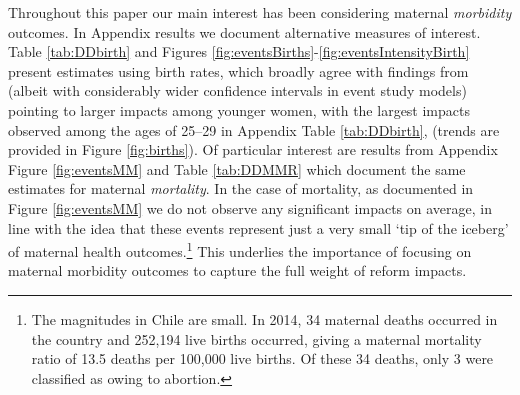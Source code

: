 \documentclass[12pt]{article}
\begin{document}
\begin{spacing}{1.9}
  Throughout this paper our main interest has been considering maternal \emph{morbidity} outcomes.  In Appendix results we document alternative measures of interest.  Table \ref{tab:DDbirth} and Figures \ref{fig:eventsBirths}-\ref{fig:eventsIntensityBirth} present estimates using birth rates, which broadly agree with findings from \citet{BentancorClarke2017} (albeit with considerably wider confidence intervals in event study models) pointing to larger impacts among younger women, with the largest impacts observed among the ages of 25--29 in Appendix Table \ref{tab:DDbirth}, (trends are provided in Figure \ref{fig:births}).  Of particular interest are results from Appendix Figure \ref{fig:eventsMM} and Table \ref{tab:DDMMR} which document the same estimates for maternal \emph{mortality}. In the case of mortality, as documented in Figure \ref{fig:eventsMM} we do not observe any significant impacts on average, in line with the idea that these events represent just a very small `tip of the iceberg' of maternal health outcomes.\footnote{The magnitudes in Chile are small.  In 2014, 34 maternal deaths occurred in the country and 252,194 live births occurred, giving a maternal mortality ratio of 13.5 deaths per 100,000 live births.  Of these 34 deaths, only 3 were classified as owing to abortion.}  This underlies the importance of focusing on maternal morbidity outcomes to capture the full weight of reform impacts.


\end{spacing}
\end{document}
